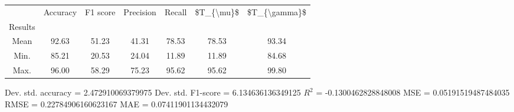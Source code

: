 \begin{tabular}{|c|c|c|c|c|c|c|}
\toprule
{} &  Accuracy &  F1 score &  Precision &  Recall &  \$T\_\{\textbackslash mu\}\$ &  \$T\_\{\textbackslash gamma\}\$ \\
Results &           &           &            &         &            &               \\
\hline
Mean    &     92.63 &     51.23 &      41.31 &   78.53 &      78.53 &         93.34 \\
Min.    &     85.21 &     20.53 &      24.04 &   11.89 &      11.89 &         84.68 \\
Max.    &     96.00 &     58.29 &      75.23 &   95.62 &      95.62 &         99.80 \\
\bottomrule
\end{tabular}

 Dev. std. accuracy = 2.472910069379975
 Dev. std. F1-score = 6.134636136349125
 $R^2$ = -0.1300462828848008
 MSE = 0.05191519487484035
 RMSE = 0.22784906160623167
 MAE = 0.07411901134432079